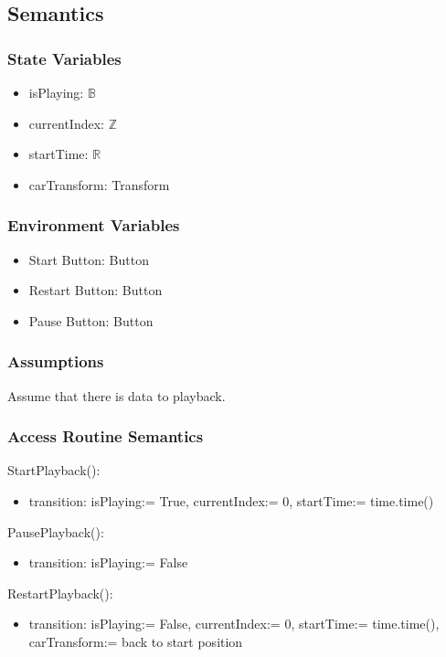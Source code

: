 \documentclass[12pt, titlepage]{article}
\begin{document}
\subsection{Semantics}

\subsubsection{State Variables}

\begin{itemize}
  \item isPlaying: $\mathbb{B}$
  \item currentIndex: $\mathbb{Z}$
  \item startTime: $\mathbb{R}$ 
  \item carTransform: Transform
\end{itemize}

\subsubsection{Environment Variables}

\begin{itemize}
  \item Start Button: Button
  \item Restart Button: Button
  \item Pause Button: Button
\end{itemize}

\subsubsection{Assumptions}

Assume that there is data to playback.
\subsubsection{Access Routine Semantics}

\noindent StartPlayback():
\begin{itemize}
\item transition: isPlaying:= True, currentIndex:= 0, startTime:= time.time()
\end{itemize}

\noindent PausePlayback():
\begin{itemize}
\item transition: isPlaying:= False
\end{itemize}

\noindent RestartPlayback():
\begin{itemize}
\item transition: isPlaying:= False, currentIndex:= 0, startTime:= time.time(), carTransform:= back to start position
\end{itemize}
\end{document}
